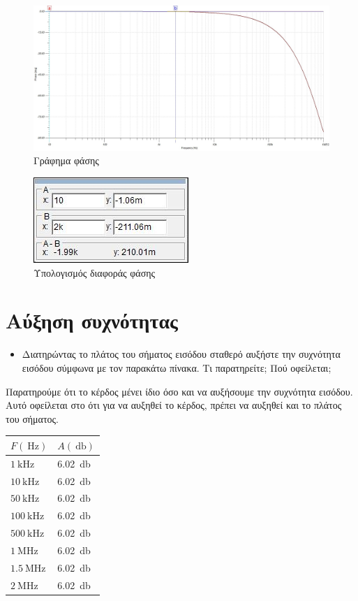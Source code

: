 \documentclass[12pt]{article}
\begin{document}
\begin{figure}[H]
	\centering
	\includegraphics[width=\linewidth]{./res/phase.jpg}
	\caption{Γράφημα φάσης}
\end{figure}
\begin{figure}[H]
	\centering
	\includegraphics{./res/phasecalc.jpg}
	\caption{Υπολογισμός διαφοράς φάσης}
\end{figure}

\section{Αύξηση συχνότητας}

\begin{itemize}
	\item Διατηρώντας το πλάτος του σήματος εισόδου σταθερό αυξήστε την
		συχνότητα εισόδου σύμφωνα με τον παρακάτω πίνακα. Τι
		παρατηρείτε; Πού οφείλεται;
\end{itemize}

Παρατηρούμε ότι το κέρδος μένει ίδιο όσο και να αυξήσουμε την συχνότητα
εισόδου. Αυτό οφείλεται στο ότι για να αυξηθεί το κέρδος, πρέπει να αυξηθεί και
το πλάτος του σήματος.

\begin{center}
\begin{tabular}{|l|l|}
	\hline
	$F(\SI{}{\hertz})$ & $A(\SI{}{\decibel})$ \\
	\hline
	$\SI{1}{\kilo\hertz}$ & \SI{6.02}{\decibel} \\
	\hline
	$\SI{10}{\kilo\hertz}$ & \SI{6.02}{\decibel} \\
	\hline
	$\SI{50}{\kilo\hertz}$ & \SI{6.02}{\decibel} \\
	\hline
	$\SI{100}{\kilo\hertz}$ & \SI{6.02}{\decibel} \\
	\hline
	$\SI{500}{\kilo\hertz}$ & \SI{6.02}{\decibel} \\
	\hline
	$\SI{1}{\mega\hertz}$ & \SI{6.02}{\decibel} \\
	\hline
	$\SI{1.5}{\mega\hertz}$ & \SI{6.02}{\decibel} \\
	\hline
	$\SI{2}{\mega\hertz}$ & \SI{6.02}{\decibel} \\
	\hline
\end{tabular}
\end{center}
\end{document}
